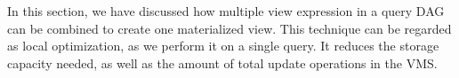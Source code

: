 In this section, we have discussed how multiple view expression in a 
query DAG can be combined to create one materialized view. This 
technique can be regarded as local optimization, as we perform it on
a single query. It reduces the storage capacity needed, as well as the
amount of total update operations in the VMS.




    





